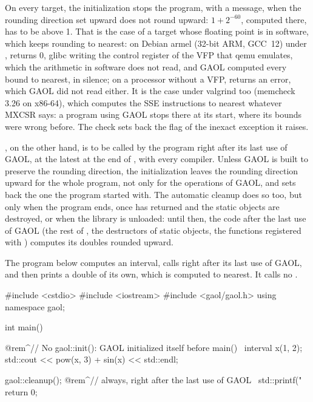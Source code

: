 On every target, the initialization stops the program, with a message, when
the rounding direction set upward does not round upward: $1 + 2^{-60}$,
computed there, has to be above 1.\newinvfive{} That is the case of a target
whose floating point is in software, which keeps rounding to nearest: on Debian
armel (32-bit ARM, GCC~12) under , 
returns 0, glibc writing the control register of the VFP that qemu emulates,
which the arithmetic in software does not read, and GAOL computed every bound
to nearest, in silence; on a processor without a VFP, 
returns an error, which GAOL did not read either. It is the case under
valgrind too (memcheck 3.26 on x86-64), which computes the SSE instructions to
nearest whatever MXCSR says: a program using GAOL stops there at its start,
where its bounds were wrong before. The check sets back the flag of the inexact
exception it raises.

\begin{Rem}\label{rem:cleanup-rounding}
, on the other hand, is to be called by the program right
after its last use of GAOL, at the latest at the end of , with
every compiler.\newinvfive{} Unless GAOL is built to preserve the rounding
direction, the initialization leaves the rounding direction upward for the
whole program, not only for the operations of GAOL, and  sets
back the one the program started with. The automatic cleanup does so too, but
only when the program ends, once  has returned and the static
objects are destroyed, or when the library is unloaded: until then, the code
after the last use of GAOL (the rest of , the destructors of
static objects, the functions registered with ) computes
its doubles rounded upward.
\end{Rem}

\begin{Ex}\label{ex:cleanup}
The program below computes an interval, calls  right after
its last use of GAOL, and then prints a double of its own, which is computed
to nearest. It calls no .
\begin{example}
#include <cstdio>
#include <iostream>
#include <gaol/gaol.h>
using namespace gaol;

int main()
{
  @rem^// No gaol::init(): GAOL initialized itself before main()~
  interval x(1, 2);
  std::cout << pow(x, 3) + sin(x) << std::endl;

  gaol::cleanup();   @rem^// always, right after the last use of GAOL~
  std::printf("%
  return 0;
}
\end{example}
\end{Ex}

